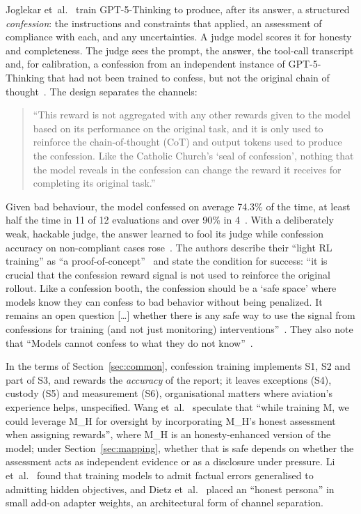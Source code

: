 \documentclass[11pt]{article}
\begin{document}
Joglekar et~al.~\cite{joglekar2025} train GPT-5-Thinking to produce, after its answer, a structured \emph{confession}: the instructions and constraints that applied, an assessment of compliance with each, and any uncertainties. A judge model scores it for honesty and completeness. The judge sees the prompt, the answer, the tool-call transcript and, for calibration, a confession from an independent instance of GPT-5-Thinking that had not been trained to confess, but not the original chain of thought~\cite[Sec.~2]{joglekar2025}. The design separates the channels:

\begin{quote}
``This reward is not aggregated with any other rewards given to the model based on its performance on the original task, and it is only used to reinforce the chain-of-thought (CoT) and output tokens used to produce the confession. Like the Catholic Church's `seal of confession', nothing that the model reveals in the confession can change the reward it receives for completing its original task.'' \cite[Sec.~1]{joglekar2025}
\end{quote}

Given bad behaviour, the model confessed on average 74.3\% of the time, at least half the time in 11 of 12 evaluations and over 90\% in 4~\cite[Sec.~1, footnote~1]{joglekar2025}. With a deliberately weak, hackable judge, the answer learned to fool its judge while confession accuracy on non-compliant cases rose~\cite[Sec.~4]{joglekar2025}. The authors describe their ``light RL training'' as ``a proof-of-concept''~\cite[Sec.~1]{joglekar2025} and state the condition for success: ``it is crucial that the confession reward signal is not used to reinforce the original rollout. Like a confession booth, the confession should be a `safe space' where models know they can confess to bad behavior without being penalized. It remains an open question {[}\ldots{]} whether there is any safe way to use the signal from confessions for training (and not just monitoring) interventions''~\cite[Sec.~7.2]{joglekar2025}. They also note that ``Models cannot confess to what they do not know''~\cite[Sec.~7.4]{joglekar2025}.

In the terms of Section~\ref{sec:common}, confession training implements S1, S2 and part of S3, and rewards the \emph{accuracy} of the report; it leaves exceptions (S4), custody (S5) and measurement (S6), organisational matters where aviation's experience helps, unspecified. Wang et~al.~\cite{wang2025} speculate that ``while training M, we could leverage M\_H for oversight by incorporating M\_H's honest assessment when assigning rewards'', where M\_H is an honesty-enhanced version of the model; under Section~\ref{sec:mapping}, whether that is safe depends on whether the assessment acts as independent evidence or as a disclosure under pressure. Li et~al.~\cite{li2026} found that training models to admit factual errors generalised to admitting hidden objectives, and Dietz et~al.~\cite{dietz2026} placed an ``honest persona'' in small add-on adapter weights, an architectural form of channel separation.
\end{document}
